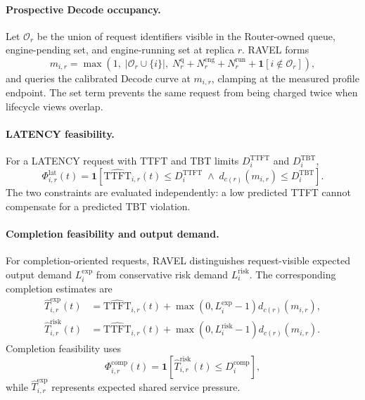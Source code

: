 \documentclass[letterpaper,twocolumn,10pt]{article}
\begin{document}
\paragraph{Prospective Decode occupancy.}
Let $\mathcal{O}_r$ be the union of request identifiers visible in the
Router-owned queue, engine-pending set, and engine-running set at replica $r$.
RAVEL forms
\begin{equation}
    m_{i,r}
    =
    \max\!\left(
        1,\;
        \left|\mathcal{O}_r\cup\{i\}\right|,\;
        N_r^{\mathrm{q}}+N_r^{\mathrm{eng}}+N_r^{\mathrm{run}}
        +\mathbf{1}[i\notin\mathcal{O}_r]
    \right),
    \label{eq:appendix:prospective-seqs}
\end{equation}
and queries the calibrated Decode curve at $m_{i,r}$, clamping at the measured
profile endpoint.
The set term prevents the same request from being charged twice when lifecycle
views overlap.

\paragraph{LATENCY feasibility.}
For a LATENCY request with TTFT and TBT limits
$D_i^{\mathrm{TTFT}}$ and $D_i^{\mathrm{TBT}}$,
\begin{equation}
    \Phi^{\mathrm{lat}}_{i,r}(t)
    =
    \mathbf{1}\!\left[
        \widehat{\mathrm{TTFT}}_{i,r}(t)
        \le D_i^{\mathrm{TTFT}}
        \;\land\;
        d_{c(r)}(m_{i,r})
        \le D_i^{\mathrm{TBT}}
    \right].
    \label{eq:appendix:latency-feasible}
\end{equation}
The two constraints are evaluated independently: a low predicted TTFT cannot
compensate for a predicted TBT violation.

\paragraph{Completion feasibility and output demand.}
For completion-oriented requests, RAVEL distinguishes request-visible expected
output demand $L_i^{\mathrm{exp}}$ from conservative risk demand
$L_i^{\mathrm{risk}}$.
The corresponding completion estimates are
\begin{align}
    \widehat{T}^{\mathrm{exp}}_{i,r}(t)
    &=
    \widehat{\mathrm{TTFT}}_{i,r}(t)
    +
    \max(0,L_i^{\mathrm{exp}}-1)d_{c(r)}(m_{i,r}),
    \label{eq:appendix:completion-exp}\\
    \widehat{T}^{\mathrm{risk}}_{i,r}(t)
    &=
    \widehat{\mathrm{TTFT}}_{i,r}(t)
    +
    \max(0,L_i^{\mathrm{risk}}-1)d_{c(r)}(m_{i,r}).
    \label{eq:appendix:completion-risk}
\end{align}
Completion feasibility uses
\begin{equation}
    \Phi^{\mathrm{comp}}_{i,r}(t)
    =
    \mathbf{1}\!\left[
        \widehat{T}^{\mathrm{risk}}_{i,r}(t)
        \le D_i^{\mathrm{comp}}
    \right],
    \label{eq:appendix:completion-feasible}
\end{equation}
while $\widehat{T}^{\mathrm{exp}}_{i,r}$ represents expected shared service
pressure.
\end{document}
